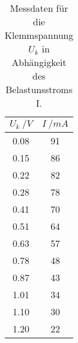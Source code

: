 \begin{table}[H]
  \centering
   \begin{tabular}{c c}
    \toprule
    $U_{k} \: /V $ & $ I \: /mA $  \\
    \midrule
    0.08 & 91 \\
    0.15 & 86 \\
    0.22 & 82 \\
    0.28 & 78 \\
    0.41 & 70 \\
    0.51 & 64 \\
    0.63 & 57 \\
    0.78 & 48 \\
    0.87 & 43 \\
    1.01 & 34 \\
    1.10 & 30 \\
    1.20 & 22 \\
    \bottomrule
  \end{tabular}
  \caption{Messdaten für die Klemmspannung $U_{k}$ in Abhängigkeit des Belastunsstroms I.}
  \label{tab:tabelle1}
\end{table}
